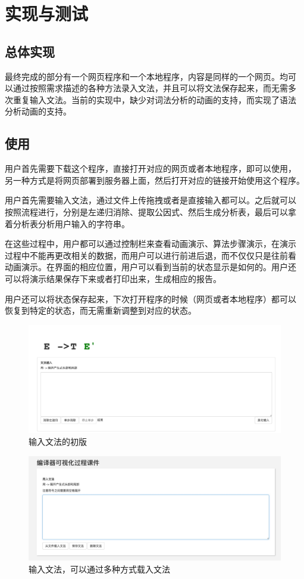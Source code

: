 \section{实现与测试}
\subsection{总体实现}
最终完成的部分有一个网页程序和一个本地程序，内容是同样的一个网页。均可
以通过按照需求描述的各种方法录入文法，并且可以将文法保存起来，而无需多
次重复输入文法。当前的实现中，缺少对词法分析的动画的支持，而实现了语法
分析动画的支持。
\subsection{使用}
用户首先需要下载这个程序，直接打开对应的网页或者本地程序，即可以使用，
另一种方式是将网页部署到服务器上面，然后打开对应的链接开始使用这个程序。

用户首先需要输入文法，通过文件上传拖拽或者是直接输入都可以。之后就可以
按照流程进行，分别是左递归消除、提取公因式、然后生成分析表，最后可以拿
着分析表分析用户输入的字符串。

在这些过程中，用户都可以通过控制栏来查看动画演示、算法步骤演示，在演示
过程中不能再更改相关的数据，而用户可以进行前进后退，而不仅仅只是往前看
动画演示。在界面的相应位置，用户可以看到当前的状态显示是如何的。用户还
可以将演示结果保存下来或者打印出来，生成相应的报告。

用户还可以将状态保存起来，下次打开程序的时候（网页或者本地程序）都可以
恢复到特定的状态，而无需重新调整到对应的状态。
\begin{figure}[!htb]
	\centering
	\includegraphics[width=1\linewidth]{img/grammarinput2.jpg}
	\caption{输入文法的初版}
	\label{fig:grammarinput2.jpg}
\end{figure}

\begin{figure}[!htb]
	\centering
	\includegraphics[width=1\linewidth]{img/grammarinput3.jpg}
	\caption{输入文法，可以通过多种方式载入文法}
	\label{fig:grammarinput3.jpg}
\end{figure}

